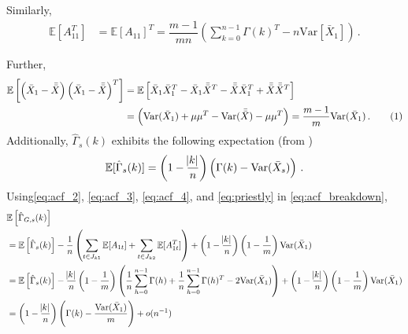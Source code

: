 \documentclass[12pt]{article}
\newcommand{\E}{\mathbb{E}}
\newcommand{\Var}{\text{Var}}
\newcommand\numberthis{\addtocounter{equation}{1}\tag{\theequation}}
\theoremstyle{remark}
\begin{document}
%
Similarly,
\begin{align}
\label{eq:acf_3}
    \mathbb{E} \left[ A_{11}^T \right] &= \mathbb{E}\left[ A_{11}\right]^T = \dfrac{m-1}{mn}\left(\sum_{k=0}^{n-1}\Gamma(k)^T - n\text{Var}\left[\bar{X}_1 \right] \right)\,.
\end{align}


Further,
\begin{align*}
\mathbb{E}\left[ \left(\bar{X}_{1} - \bar{\bar{X}} \right)  \left(\bar{X}_{1} - \bar{\bar{X}} \right)^{T}\right] &= \mathbb{E}\left[ \bar{X}_{1}\bar{X}_{1}^{T} - \bar{X}_{1}\bar{\bar{X}}^{T} - \bar{\bar{X}} \bar{X}_{1}^{T} + \bar{\bar{X}}\bar{\bar{X}}^{T}\right]\\
&= \left(\Var(\bar{X}_{1}) + \mu\mu^{T} - \Var(\bar{\bar{X}}) - \mu\mu^{T}\right)= \dfrac{m-1}{m}\Var(\bar{X}_1)\,. \numberthis \label{eq:acf_4}
\end{align*}
%
Additionally, $\hat{\Gamma}_s(k)$ exhibits the following expectation (from \cite{priestley1981spectral})
 \begin{equation} \label{eq:priestly}
     \mathbb{E}[\hat{\Gamma}_s(k)] = \left(1- \dfrac{\abs{k}}{n}\right)\left(\Gamma(k) - \Var{(\bar{X}_s)}
 \right)\,.
 \end{equation}
%
Using\eqref{eq:acf_2}, \eqref{eq:acf_3}, \eqref{eq:acf_4}, and  \eqref{eq:priestly} in \eqref{eq:acf_breakdown},
\begin{align*}
    & \E \left[\hat{\Gamma}_{G,s}(k) \right] \\
    &= \mathbb{E}\left[\hat{\Gamma}_{s}(k)\right] - \dfrac{1}{n} \left(\sum\limits_{t \in J_{k1}}\mathbb{E}[A_{1t}] + \sum\limits_{t \in J_{k2}}\mathbb{E}[A_{1t}^T] \right) + \left(1- \dfrac{\abs{k}}{n}\right)\left(1-\dfrac{1}{m}\right)\Var(\bar{X}_1)\\
    &= \mathbb{E}\left[\hat{\Gamma}_{s}(k)\right] - \dfrac{\abs{k}}{n}\left(1-\dfrac{1}{m}\right)\left(\dfrac{1}{n}\sum_{h=0}^{n-1}\Gamma(h) + \dfrac{1}{n}\sum_{h=0}^{n-1}\Gamma(h)^T - 2 \Var(\bar{X}_1)\right) + \left(1- \dfrac{\abs{k}}{n}\right)\left(1-\dfrac{1}{m}\right)\Var(\bar{X}_1)\\
   &= \left(1- \dfrac{\abs{k}}{n}\right)\left( \Gamma(k) - \dfrac{\Var (\bar{X}_1)}{m} \right) + o(n^{-1})%
\end{align*}
%
\end{document}
